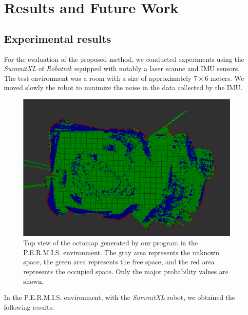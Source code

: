 
\chapter{Results and Future Work}

\section{Experimental results}

For the evaluation of the proposed method, we conducted experiments using the \textit{SummitXL} of \textit{Robotnik} equipped with notably a laser scanne and IMU sensors.
The test environment was a room with a size of approximately $ 7 \times 6 $ meters.
We moved slowly the robot to minimize the noise in the data collected by the IMU.


\begin{figure}[H]
    \centering
    \includegraphics[width=\textwidth]{images/top_screenshot.png}
    \caption{Top view of the octomap generated by our program in the P.E.R.M.I.S. environment. The gray area represents the unknown space, the green area represents the free space, and the red area represents the occupied space. Only the major probability values are shown.}
\end{figure}

In the P.E.R.M.I.S. environment, with the \textit{SummitXL} robot, we obtained the following results:

